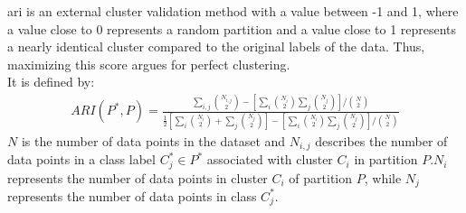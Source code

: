 \acrshort{ari} is an external cluster validation method with a value between -1 and 1, where a value close to 0 represents a random partition and a value close to 1 represents a nearly identical cluster compared to the original labels of the data. Thus, maximizing this score argues for perfect clustering.\\
It is defined by: \cite{ari}
\begin{align}
    ARI(P^*,P) = \frac{\sum_{i,j}\binom{N_{i,j}}{2}-[\sum_{i}\binom{N_{i}}{2}\sum_{j}\binom{N_{j}}{2}]/\binom{N}{2}}{\frac{1}{2}[\sum_{i}\binom{N_{i}}{2}+\sum_{j}\binom{N_{j}}{2}]-[\sum_{i}\binom{N_{i}}{2}\sum_{j}\binom{N_{j}}{2}]/\binom{N}{2}}
\end{align}
$N$ is the number of data points in the dataset and $N_{i,j}$ describes the number of data points in a class label $C_j^* \in P^*$ associated with cluster $C_i$ in partition $P$.$N_i$ represents the number of data points in cluster $C_i$ of partition $P$, while $N_j$ represents the number of data points in class $C_j^*$. \cite{ari}